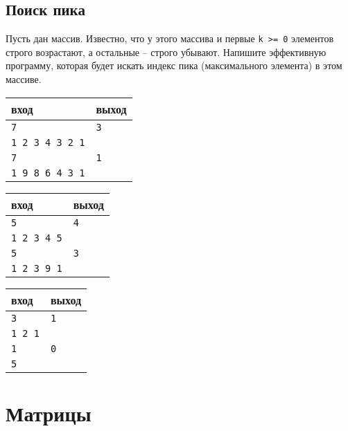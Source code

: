 \documentclass{article}
\begin{document}
\subsection{Поиск пика}
Пусть дан массив. Известно, что у этого массива и первые \texttt{k >= 0} элементов строго возрастают, а остальные -- строго убывают. Напишите эффективную программу, которая будет искать индекс пика (максимального элемента) в этом массиве.

\begin{multicols}{3}
\begin{center}
\begin{tabular}{ l | l }
 вход & выход \\ \hline
 \texttt{7} & \texttt{3}  \\  
 \texttt{1 2 3 4 3 2 1} & \\\hline
 \texttt{7} & \texttt{1}  \\  
 \texttt{1 9 8 6 4 3 1} & \\
\end{tabular}
\end{center}

\begin{center}
\begin{tabular}{ l | l }
 вход & выход \\ \hline
 \texttt{5} & \texttt{4}  \\  
 \texttt{1 2 3 4 5} & \\ \hline
 \texttt{5} & \texttt{3}  \\  
 \texttt{1 2 3 9 1} & \\
\end{tabular}
\end{center}

\begin{center}
\begin{tabular}{ l | l }
 вход & выход \\ \hline
 \texttt{3} & \texttt{1}  \\  
 \texttt{1 2 1} & \\ \hline
 \texttt{1} & \texttt{0}  \\  
 \texttt{5} & \\
\end{tabular}
\end{center}
\end{multicols}


\newpage
\section*{Матрицы}
\end{document}
